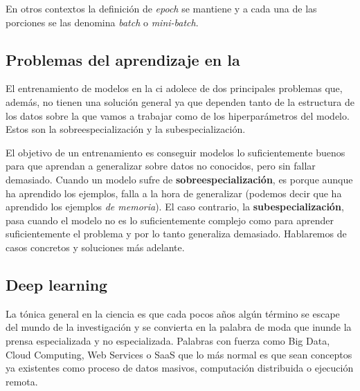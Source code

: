 En otros contextos la definición de \textit{epoch} se mantiene y a cada una de las porciones se las denomina \textit{batch} o \textit{mini-batch}.

\subsection{Problemas del aprendizaje en la }

El entrenamiento de modelos en la \gls{ci} adolece de dos principales problemas que, además, no tienen una solución general ya que dependen tanto de la estructura de los datos sobre la que vamos a trabajar como de los hiperparámetros del modelo. Estos son la sobreespecialización y la subespecialización.

El objetivo de un entrenamiento es conseguir modelos lo suficientemente buenos para que aprendan a generalizar sobre datos no conocidos, pero sin fallar demasiado. Cuando un modelo sufre de \textbf{sobreespecialización}, es porque aunque ha aprendido los ejemplos, falla a la hora de generalizar (podemos decir que ha aprendido los ejemplos \textit{de memoria}). El caso contrario, la \textbf{subespecialización}, pasa cuando el modelo no es lo suficientemente complejo como para aprender suficientemente el problema y por lo tanto generaliza demasiado. Hablaremos de casos concretos y soluciones más adelante.

\subsection{Deep learning}
\label{ss:deep-learning}

La tónica general en la ciencia es que cada pocos años algún término se escape del mundo de la investigación y se convierta en la palabra de moda que inunde la prensa especializada y no especializada. Palabras con fuerza como Big Data, Cloud Computing, Web Services o SaaS que lo más normal es que sean conceptos ya existentes como proceso de datos masivos, computación distribuida o ejecución remota.

